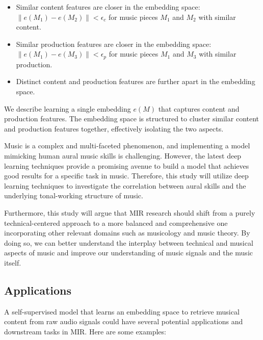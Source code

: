 \begin{itemize}
  \item Similar content features are closer in the embedding space: $\|e(M_1) - e(M_2)\| < \epsilon_c$ for music pieces $M_1$ and $M_2$ with similar content.
  \item Similar production features are closer in the embedding space: $\|e(M_1) - e(M_3)\| < \epsilon_p$ for music pieces $M_1$ and $M_3$ with similar production.
  \item Distinct content and production features are further apart in the embedding space.
\end{itemize}

We describe learning a single embedding $e(M)$ that captures content and production features. The embedding space is structured to cluster similar content and production features together, effectively isolating the two aspects.

Music is a complex and multi-faceted phenomenon, and implementing a model mimicking human aural music skills is challenging. However, the latest deep learning techniques provide a promising avenue to build a model that achieves good results for a specific task in music. Therefore, this study will utilize deep learning techniques to investigate the correlation between aural skills and the underlying tonal-working structure of music.

Furthermore, this study will argue that MIR research should shift from a purely technical-centered approach to a more balanced and comprehensive one incorporating other relevant domains such as musicology and music theory. By doing so, we can better understand the interplay between technical and musical aspects of music and improve our understanding of music signals and the music itself.


\subsection{Applications}

A self-supervised model that learns an embedding space to retrieve musical content from raw audio signals could have several potential applications and downstream tasks in MIR. Here are some examples:

